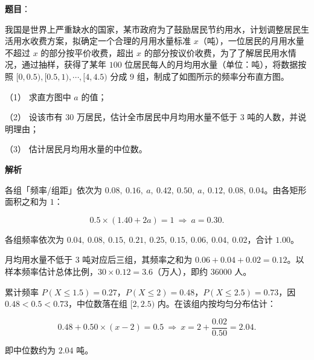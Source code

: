 \begin{answer}

\textbf{题目}：

我国是世界上严重缺水的国家，某市政府为了鼓励居民节约用水，计划调整居民生活用水收费方案，拟确定一个合理的月用水量标准 \(x\)（吨），一位居民的月用水量不超过 \(x\) 的部分按平价收费，超出 \(x\) 的部分按议价收费，为了了解居民用水情况，通过抽样，获得了某年 \(100\) 位居民每人的月均用水量（单位：吨），将数据按照 \([0,0.5),[0.5,1),\cdots,[4,4.5)\) 分成 \(9\) 组，制成了如图所示的频率分布直方图。
\nopagebreak[4]
\begin{center}\end{center}
\nopagebreak[4]
（1） 求直方图中 \(a\) 的值；

（2） 设该市有 \(30\) 万居民，估计全市居民中月均用水量不低于 \(3\) 吨的人数，并说明理由；

（3） 估计居民月均用水量的中位数。

\textbf{解析}


各组「频率/组距」依次为 \(0.08,\ 0.16,\ a,\ 0.42,\ 0.50,\ a,\ 0.12,\ 0.08,\ 0.04\)。由各矩形面积之和为 \(1\)：

\nopagebreak[4]
\[
0.5\times(1.40+2a)=1\ \Longrightarrow\ a=0.30.
\]

各组频率依次为 \(0.04,\ 0.08,\ 0.15,\ 0.21,\ 0.25,\ 0.15,\ 0.06,\ 0.04,\ 0.02\)，合计 \(1.00\)。


月均用水量不低于 \(3\) 吨对应后三组，其频率之和为 \(0.06+0.04+0.02=0.12\)。以样本频率估计总体比例，\(30\times0.12=3.6\)（万人），即约 \(36000\) 人。


累计频率 \(P(X\leqslant1.5)=0.27\)，\(P(X\leqslant2)=0.48\)，\(P(X\leqslant2.5)=0.73\)，因 \(0.48<0.5<0.73\)，中位数落在组 \([2,2.5)\) 内。在该组内按均匀分布估计：

\nopagebreak[4]
\[
0.48+0.50\times(x-2)=0.5\ \Longrightarrow\ x=2+\frac{0.02}{0.50}=2.04.
\]

即中位数约为 \(2.04\) 吨。




\end{answer}
